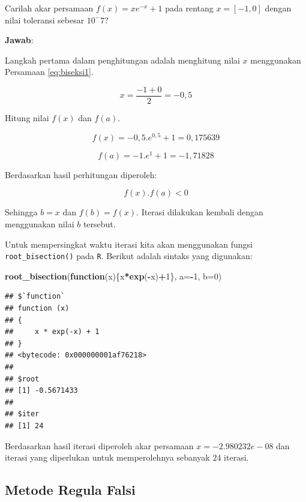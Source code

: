 \documentclass[]{book}
\newenvironment{Shaded}{\begin{snugshade}}{\end{snugshade}}
\newcommand{\ControlFlowTok}[1]{\textcolor[rgb]{0.13,0.29,0.53}{\textbf{#1}}}
\newcommand{\DataTypeTok}[1]{\textcolor[rgb]{0.13,0.29,0.53}{#1}}
\newcommand{\DecValTok}[1]{\textcolor[rgb]{0.00,0.00,0.81}{#1}}
\newcommand{\KeywordTok}[1]{\textcolor[rgb]{0.13,0.29,0.53}{\textbf{#1}}}
\newcommand{\NormalTok}[1]{#1}
\newcommand{\OperatorTok}[1]{\textcolor[rgb]{0.81,0.36,0.00}{\textbf{#1}}}
\theoremstyle{definition}
\theoremstyle{definition}
\theoremstyle{definition}
\theoremstyle{remark}
\let\BeginKnitrBlock\begin \let\EndKnitrBlock\end
\begin{document}
\BeginKnitrBlock{example}
\protect\hypertarget{exm:biseksexmp}{}{\label{exm:biseksexmp} }Carilah akar persamaan \(f\left(x \right)=xe^{-x}+1\) pada rentang \(x=\left[-1,0 \right]\) dengan nilai toleransi sebesar \(10^-7\)?
\EndKnitrBlock{example}

\textbf{Jawab}:

Langkah pertama dalam penghitungan adalah menghitung nilai \(x\) menggunakan Persamaan \eqref{eq:biseksi1}.

\[
x=\frac{-1+0}{2}=-0,5
\]

Hitung nilai \(f\left(x \right)\) dan \(f\left(a \right)\).

\[
f\left(x \right)=-0,5.e^{0,5}+1=0,175639
\]

\[
f\left(a \right)=-1.e^{1}+1=-1,71828
\]

Berdasarkan hasil perhitungan diperoleh:

\[
f\left(x \right).f\left(a \right)<0
\]

Sehingga \(b=x\) dan \(f\left(b \right)=f\left(x \right)\). Iterasi dilakukan kembali dengan menggunakan nilai \(b\) tersebut.

Untuk mempersingkat waktu iterasi kita akan menggunakan fungsi \texttt{root\_bisection()} pada \texttt{R}. Berikut adalah sintaks yang digunakan:

\begin{Shaded}
\begin{Highlighting}[]
\KeywordTok{root_bisection}\NormalTok{(}\ControlFlowTok{function}\NormalTok{(x)\{x}\OperatorTok{*}\KeywordTok{exp}\NormalTok{(}\OperatorTok{-}\NormalTok{x)}\OperatorTok{+}\DecValTok{1}\NormalTok{\},}
               \DataTypeTok{a=}\OperatorTok{-}\DecValTok{1}\NormalTok{, }\DataTypeTok{b=}\DecValTok{0}\NormalTok{)}
\end{Highlighting}
\end{Shaded}

\begin{verbatim}
## $`function`
## function (x) 
## {
##     x * exp(-x) + 1
## }
## <bytecode: 0x000000001af76218>
## 
## $root
## [1] -0.5671433
## 
## $iter
## [1] 24
\end{verbatim}

Berdasarkan hasil iterasi diperoleh akar persamaan \(x=-2.980232e-08\) dan iterasi yang diperlukan untuk memperolehnya sebanyak \(24\) iterasi.

\hypertarget{regulafalsi}{%
\subsection{Metode Regula Falsi}\label{regulafalsi}}
\end{document}
